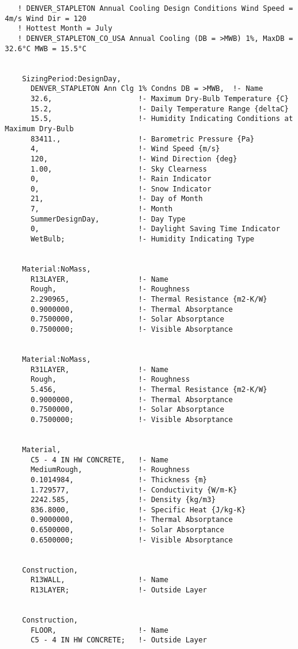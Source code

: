 \begin{lstlisting}
   ! DENVER_STAPLETON Annual Cooling Design Conditions Wind Speed = 4m/s Wind Dir = 120
   ! Hottest Month = July
   ! DENVER_STAPLETON_CO_USA Annual Cooling (DB = >MWB) 1%, MaxDB = 32.6°C MWB = 15.5°C


    SizingPeriod:DesignDay,
      DENVER_STAPLETON Ann Clg 1% Condns DB = >MWB,  !- Name
      32.6,                    !- Maximum Dry-Bulb Temperature {C}
      15.2,                    !- Daily Temperature Range {deltaC}
      15.5,                    !- Humidity Indicating Conditions at Maximum Dry-Bulb
      83411.,                  !- Barometric Pressure {Pa}
      4,                       !- Wind Speed {m/s}
      120,                     !- Wind Direction {deg}
      1.00,                    !- Sky Clearness
      0,                       !- Rain Indicator
      0,                       !- Snow Indicator
      21,                      !- Day of Month
      7,                       !- Month
      SummerDesignDay,         !- Day Type
      0,                       !- Daylight Saving Time Indicator
      WetBulb;                 !- Humidity Indicating Type


    Material:NoMass,
      R13LAYER,                !- Name
      Rough,                   !- Roughness
      2.290965,                !- Thermal Resistance {m2-K/W}
      0.9000000,               !- Thermal Absorptance
      0.7500000,               !- Solar Absorptance
      0.7500000;               !- Visible Absorptance


    Material:NoMass,
      R31LAYER,                !- Name
      Rough,                   !- Roughness
      5.456,                   !- Thermal Resistance {m2-K/W}
      0.9000000,               !- Thermal Absorptance
      0.7500000,               !- Solar Absorptance
      0.7500000;               !- Visible Absorptance


    Material,
      C5 - 4 IN HW CONCRETE,   !- Name
      MediumRough,             !- Roughness
      0.1014984,               !- Thickness {m}
      1.729577,                !- Conductivity {W/m-K}
      2242.585,                !- Density {kg/m3}
      836.8000,                !- Specific Heat {J/kg-K}
      0.9000000,               !- Thermal Absorptance
      0.6500000,               !- Solar Absorptance
      0.6500000;               !- Visible Absorptance


    Construction,
      R13WALL,                 !- Name
      R13LAYER;                !- Outside Layer


    Construction,
      FLOOR,                   !- Name
      C5 - 4 IN HW CONCRETE;   !- Outside Layer



\end{lstlisting}
